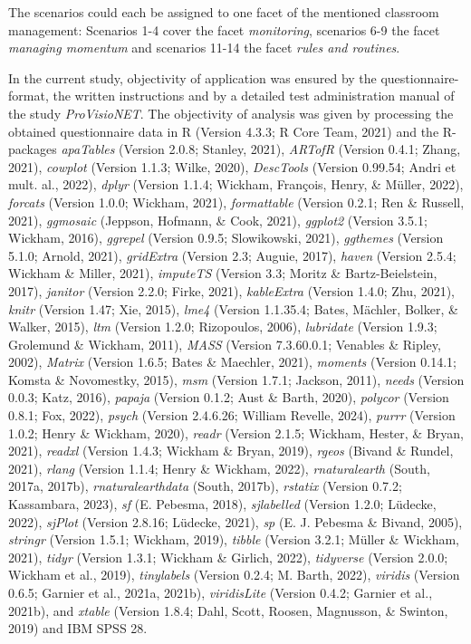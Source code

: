\documentclass[
  man]{apa6}
\begin{document}
The scenarios could each be assigned to one facet of the mentioned classroom management: Scenarios 1-4 cover the facet \emph{monitoring}, scenarios 6-9 the facet \emph{managing momentum} and scenarios 11-14 the facet \emph{rules and routines}.

In the current study, objectivity of application was ensured by the questionnaire-format, the written instructions and by a detailed test administration manual of the study \emph{ProVisioNET}. The objectivity of analysis was given by processing the obtained questionnaire data in R (Version 4.3.3; R Core Team, 2021) and the R-packages \emph{apaTables} (Version 2.0.8; Stanley, 2021), \emph{ARTofR} (Version 0.4.1; Zhang, 2021), \emph{cowplot} (Version 1.1.3; Wilke, 2020), \emph{DescTools} (Version 0.99.54; Andri et mult. al., 2022), \emph{dplyr} (Version 1.1.4; Wickham, François, Henry, \& Müller, 2022), \emph{forcats} (Version 1.0.0; Wickham, 2021), \emph{formattable} (Version 0.2.1; Ren \& Russell, 2021), \emph{ggmosaic} (Jeppson, Hofmann, \& Cook, 2021), \emph{ggplot2} (Version 3.5.1; Wickham, 2016), \emph{ggrepel} (Version 0.9.5; Slowikowski, 2021), \emph{ggthemes} (Version 5.1.0; Arnold, 2021), \emph{gridExtra} (Version 2.3; Auguie, 2017), \emph{haven} (Version 2.5.4; Wickham \& Miller, 2021), \emph{imputeTS} (Version 3.3; Moritz \& Bartz-Beielstein, 2017), \emph{janitor} (Version 2.2.0; Firke, 2021), \emph{kableExtra} (Version 1.4.0; Zhu, 2021), \emph{knitr} (Version 1.47; Xie, 2015), \emph{lme4} (Version 1.1.35.4; Bates, Mächler, Bolker, \& Walker, 2015), \emph{ltm} (Version 1.2.0; Rizopoulos, 2006), \emph{lubridate} (Version 1.9.3; Grolemund \& Wickham, 2011), \emph{MASS} (Version 7.3.60.0.1; Venables \& Ripley, 2002), \emph{Matrix} (Version 1.6.5; Bates \& Maechler, 2021), \emph{moments} (Version 0.14.1; Komsta \& Novomestky, 2015), \emph{msm} (Version 1.7.1; Jackson, 2011), \emph{needs} (Version 0.0.3; Katz, 2016), \emph{papaja} (Version 0.1.2; Aust \& Barth, 2020), \emph{polycor} (Version 0.8.1; Fox, 2022), \emph{psych} (Version 2.4.6.26; William Revelle, 2024), \emph{purrr} (Version 1.0.2; Henry \& Wickham, 2020), \emph{readr} (Version 2.1.5; Wickham, Hester, \& Bryan, 2021), \emph{readxl} (Version 1.4.3; Wickham \& Bryan, 2019), \emph{rgeos} (Bivand \& Rundel, 2021), \emph{rlang} (Version 1.1.4; Henry \& Wickham, 2022), \emph{rnaturalearth} (South, 2017a, 2017b), \emph{rnaturalearthdata} (South, 2017b), \emph{rstatix} (Version 0.7.2; Kassambara, 2023), \emph{sf} (E. Pebesma, 2018), \emph{sjlabelled} (Version 1.2.0; Lüdecke, 2022), \emph{sjPlot} (Version 2.8.16; Lüdecke, 2021), \emph{sp} (E. J. Pebesma \& Bivand, 2005), \emph{stringr} (Version 1.5.1; Wickham, 2019), \emph{tibble} (Version 3.2.1; Müller \& Wickham, 2021), \emph{tidyr} (Version 1.3.1; Wickham \& Girlich, 2022), \emph{tidyverse} (Version 2.0.0; Wickham et al., 2019), \emph{tinylabels} (Version 0.2.4; M. Barth, 2022), \emph{viridis} (Version 0.6.5; Garnier et al., 2021a, 2021b), \emph{viridisLite} (Version 0.4.2; Garnier et al., 2021b), and \emph{xtable} (Version 1.8.4; Dahl, Scott, Roosen, Magnusson, \& Swinton, 2019) and IBM SPSS 28.
\end{document}
